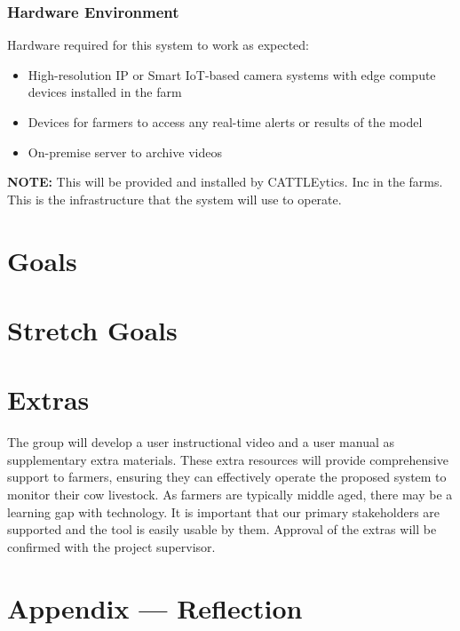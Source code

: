 \documentclass{article}
\begin{document}
\subsubsection{Hardware Environment}
Hardware required for this system to work as expected:
\begin{itemize}
    \item High-resolution IP or Smart IoT-based camera systems with edge compute devices installed in the farm
    \item Devices for farmers to access any real-time alerts or results of the model
    \item On-premise server to archive videos
\end{itemize}
\textbf{NOTE:} This will be provided and installed by CATTLEytics. Inc in the farms. This is the infrastructure that the system will use to operate.


\section{Goals}

\section{Stretch Goals}

\section{Extras}

The group will develop a user instructional video and a user manual as supplementary extra materials.  These extra resources will provide comprehensive support to farmers, ensuring they can effectively operate the proposed system to monitor their cow livestock. As farmers are typically middle aged, there may be a learning gap with technology. It is important that our primary stakeholders are supported and the tool is easily usable by them. Approval of the extras will be confirmed with the project supervisor.

\newpage{}

\section*{Appendix --- Reflection}
\end{document}
